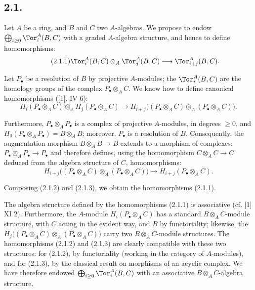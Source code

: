 \subsection*{2.1.}
Let \(A\) be a ring, and \(B\) and \(C\) two \(A\)-algebras. We propose to endow \(\bigoplus_{i\ge0}\Tor_i^A(B,C)\) with a graded \(A\)-algebra structure, and hence to define homomorphisms:
\begin{equation}\tag{2.1.1}
 \Tor_i^A(B,C)\otimes_A\Tor_j^A(B,C)\longrightarrow \Tor_{i+j}^A(B,C).
\end{equation}

Let \(P_\bullet\) be a resolution of \(B\) by projective \(A\)-modules; the \(\Tor_i^A(B,C)\) are the homology groups of the complex \(P_\bullet\otimes_A C\). We know how to define canonical homomorphisms ([1], IV 6):
\begin{equation}\tag{2.1.2}
 H_i(P_\bullet\otimes_A C)\otimes_A H_j(P_\bullet\otimes_A C)
 \longrightarrow H_{i+j}\bigl((P_\bullet\otimes_A C)\otimes_A(P_\bullet\otimes_A C)\bigr).
\end{equation}

Furthermore, \(P_\bullet\otimes_A P_\bullet\) is a complex of projective \(A\)-modules, in degrees \(\geq0\), and \(H_0(P_\bullet\otimes_A P_\bullet)=B\otimes_A B\); moreover, \(P_\bullet\) is a resolution of \(B\). Consequently, the augmentation morphism \(B\otimes_A B\to B\) extends to a morphism of complexes: \(P_\bullet\otimes_A P_\bullet\to P_\bullet\) and therefore defines, using the homomorphism \(C\otimes_A C\to C\) deduced from the algebra structure of \(C\), homomorphisms:
\begin{equation}\tag{2.1.3}
 H_{i+j}\bigl((P_\bullet\otimes_A C)\otimes_A(P_\bullet\otimes_A C)\bigr)
 \longrightarrow H_{i+j}(P_\bullet\otimes_A C).
\end{equation}

%
Composing (2.1.2) and (2.1.3), we obtain the homomorphisms (2.1.1).

The algebra structure defined by the homomorphisms (2.1.1) is associative (cf. [1] XI 2). Furthermore, the \(A\)-module \(H_i(P_\bullet\otimes_A C)\) has a standard \(B\otimes_A C\)-module structure, with \(C\) acting in the evident way, and \(B\) by functoriality; likewise, the \(H_j\bigl((P_\bullet\otimes_A C)\otimes_A(P_\bullet\otimes_A C)\bigr)\) carry two \(B\otimes_A C\)-module structures. The homomorphisms (2.1.2) and (2.1.3) are clearly compatible with these two structures: for (2.1.2), by functoriality (working in the category of \(A\)-modules), and for (2.1.3), by the classical result on morphisms of an acyclic complex. We have therefore endowed \(\bigoplus_{i\ge0}\Tor_i^A(B,C)\) with an associative \(B\otimes_A C\)-algebra structure.


